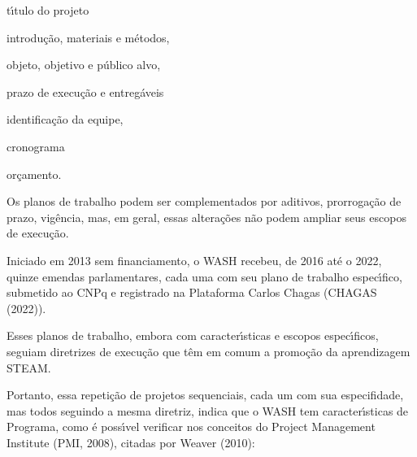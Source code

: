 \documentclass[
12pt,		%
openright,	%
twoside,  %
a4paper,			%
chapter=TITLE,		%
english,			%
french,				%
spanish,			%
brazil				%
]{USPSC-classe/USPSC}
\begin{document}
\begin{alineas}
\item t\'{\i}tulo do projeto
\item introdu\c{c}\~ao, materiais e m\'etodos,
\item objeto, objetivo e p\'ublico alvo,
\item prazo de execu\c{c}\~ao e entreg\'aveis
\item identifica\c{c}\~ao da equipe,
\item cronograma
\item or\c{c}amento.
\end{alineas}

Os planos de trabalho podem ser complementados por aditivos, prorroga\c{c}\~ao de prazo, vig\^encia, mas, em geral, essas altera\c{c}\~oes n\~ao podem ampliar seus escopos de execu\c{c}\~ao.










Iniciado em 2013 sem financiamento, o WASH recebeu, de 2016 at\'e o 2022, quinze emendas parlamentares, cada uma com seu plano de trabalho espec\'{\i}fico, submetido ao CNPq e registrado na Plataforma Carlos Chagas (CHAGAS (2022)).










Esses planos de trabalho, embora com caracter\'{\i}sticas e escopos espec\'{\i}ficos, seguiam diretrizes de execu\c{c}\~ao que t\^em em comum a promo\c{c}\~ao da aprendizagem STEAM.










Portanto, essa repeti\c{c}\~ao de projetos sequenciais, cada um com sua especifidade, mas todos seguindo a mesma diretriz, indica que o WASH tem caracter\'{\i}sticas de Programa, como \'e poss\'{\i}vel verificar nos conceitos do Project Management Institute  (PMI, 2008), citadas por  Weaver (2010):











\noindent\begin{center}\mbox{\centering{}}\end{center}
\end{document}
